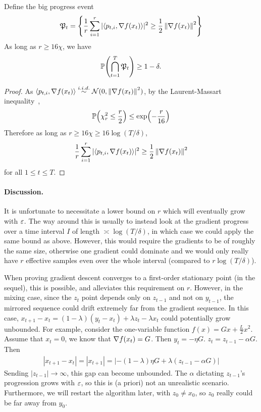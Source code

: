 \begin{lemma}
    Define the big progress event
    \begin{align*}
        \mathfrak P_{t} = \set{\frac 1r\sum_{i=1}^r |\langle p_{t,i}, \grad f(x_t) \rangle|^2 \geq \frac{1}{2} \mg{\grad f(x_t)}^2}
    \end{align*}
    As long as $r \geq 16\chi$, we have
    \begin{align*}
        \P(\bigcap_{t=1}^{T} \mathfrak P_t) \geq 1-\delta.
    \end{align*}
\end{lemma}
\begin{proof}
    As $\langle p_{t,i}, \grad f(x_t) \rangle \overset{i.i.d.}{\sim} \mathcal N(0, \mg{\grad f(x_t)}^2)$, by the Laurent-Massart inequality~\citep[Lemma~1, Equation~(4.4)]{laurent2000adaptive},
    \begin{align*}
        \P(\chi_r^2 \leq \frac{r}{2}) \leq \exp(-\frac{r}{16})
    \end{align*}
    Therefore as long as $r \geq 16\chi \geq 16\log(T/\delta)$, 
    \begin{align*}
        \frac 1r\sum_{i=1}^r |\langle p_{t,i}, \grad f(x_t) \rangle|^2 \geq \frac{1}{2} \mg{\grad f(x_t)}^2
    \end{align*}
    for all $1 \leq t \leq T$.
\end{proof}
\paragraph{Discussion.} It is unfortunate to necessitate a lower bound on $r$ which will eventually grow with $\ve$. The way around this is usually to instead look at the gradient progress over a time interval $I$ of length $\asymp \log(T/\delta)$, in which case we could apply the same bound as above. However, this would require the gradients to be of roughly the same size, otherwise one gradient could dominate and we would only really have $r$ effective samples even over the whole interval (compared to $r\log(T/\delta)$). 

When proving gradient descent converges to a first-order stationary point (in the sequel), this is possible, and alleviates this requirement on $r$. However, in the mixing case, since the $z_t$ point depends only on $z_{t-1}$ and not on $y_{t-1}$, the mirrored sequence could drift extremely far from the gradient sequence. In this case, $x_{t+1} - x_t = (1-\lambda)(y_{t} - x_t) + \lambda z_t - \lambda x_t$ could potentially grow unbounded. 
For example, consider the one-variable function $f(x) = Gx + \frac{L}{2}x^2$. Assume that $x_{t} = 0$, we know that $\grad f(x_{t}) = G$. Then $y_t = - \eta G$. $z_t = z_{t-1} - \alpha G$. Then
\begin{align*}
    |x_{t+1} - x_t| = |x_{t+1}| = |-(1-\lambda)\eta G + \lambda(z_{t-1}-\alpha G)|
\end{align*}
Sending $|z_{t-1}| \to \infty$, this gap can become unbounded. The $\alpha$ dictating $z_{t-1}$'s progression grows with $\ve$, so this is (a priori) not an unrealistic scenario. Furthermore, we will restart the algorithm later, with $z_0 \neq x_0$, so $z_0$ really could be far away from $y_0$.

